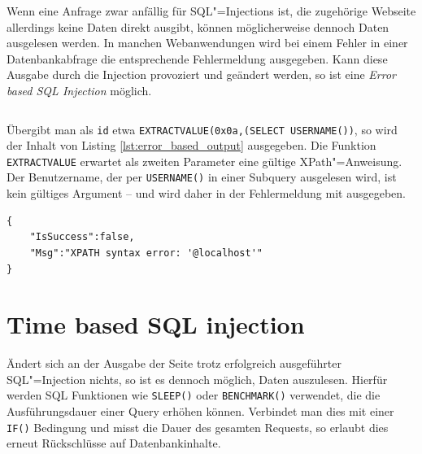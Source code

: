 Wenn eine Anfrage zwar anfällig für SQL"=Injections ist, die zugehörige Webseite allerdings keine Daten direkt ausgibt, können möglicherweise dennoch Daten ausgelesen werden. In manchen Webanwendungen wird bei einem Fehler in einer Datenbankabfrage die entsprechende Fehlermeldung ausgegeben. Kann diese Ausgabe durch die Injection provoziert und geändert werden, so ist eine \emph{Error based SQL Injection} möglich.


\begin{listing}
\begin{margincap}
\inputminted[startinline,obeytabs]{php}{imports/cp_multi_error.php}
\caption[cp multi view calendar]{Ein Auszug aus dem Wordpress"=Plugin \texttt{cp multi view calendar}\footnote{\url{https://github.com/wp-plugins/cp-multi-view-calendar}}. Die Variable \texttt{id} wird nicht überprüft und ermöglicht so SQL"=Injections. Im Fehlerfall wird die Meldung in Zeile 7 in eine lokale Variable geschrieben und später ausgegeben.}
\label{lst:cp_multi_error}
\end{margincap}
\end{listing}

Übergibt man als \texttt{id} etwa \texttt{EXTRACTVALUE(0x0a,(SELECT USERNAME())}, so wird der Inhalt von Listing \ref{lst:error_based_output} ausgegeben. Die Funktion \texttt{EXTRACTVALUE} erwartet als zweiten Parameter eine gültige XPath"=Anweisung. Der Benutzername, der per \texttt{USERNAME()} in einer Subquery ausgelesen wird, ist kein gültiges Argument -- und wird daher in der Fehlermeldung mit ausgegeben.

\begin{listing}
\begin{margincap}
\begin{verbatim}
{
    "IsSuccess":false,
    "Msg":"XPATH syntax error: '@localhost'"
}
\end{verbatim}
\caption{Ausgabe der \emph{Error based} SQL"=Injection. In der Fehlermeldung ist das Resultat der Subquery zu sehen, in diesem Fall der Rückgabewert der Funktion \texttt{USERNAME().}}
\label{lst:error_based_output}
\end{margincap}
\end{listing}


\section{Time based SQL injection}

Ändert sich an der Ausgabe der Seite trotz erfolgreich ausgeführter SQL"=Injection nichts, so ist es dennoch möglich, Daten auszulesen. Hierfür werden SQL Funktionen wie \texttt{SLEEP()} oder \texttt{BENCHMARK()} verwendet, die die Ausführungsdauer einer Query erhöhen können. Verbindet man dies mit einer \texttt{IF()} Bedingung und misst die Dauer des gesamten Requests, so erlaubt dies erneut Rückschlüsse auf Datenbankinhalte.

